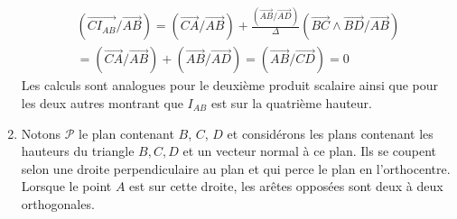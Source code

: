 \begin{enumerate}
\begin{multline*}
 (\overrightarrow{ CI_{AB}}/\overrightarrow{AB})=
 (\overrightarrow{CA}/\overrightarrow{AB}) 
+ \frac{(\overrightarrow{AB}/\overrightarrow{AD})}{\Delta} (\overrightarrow{BC}\wedge \overrightarrow{BD}/\overrightarrow{AB})\\
= (\overrightarrow{CA}/\overrightarrow{AB}) + (\overrightarrow{AB}/\overrightarrow{AD})
= (\overrightarrow{AB}/\overrightarrow{CD}) = 0
\end{multline*}
Les calculs sont analogues pour le deuxième produit scalaire ainsi que pour les deux autres montrant que $I_{AB}$ est sur la quatrième hauteur.
 \item Notons $\mathcal{P}$ le plan contenant $B$, $C$, $D$ et considérons les plans contenant les hauteurs du triangle $B,C,D$ et un vecteur normal à ce plan. Ils se coupent selon une droite perpendiculaire au plan et qui perce le plan en l'orthocentre. Lorsque le point $A$ est sur cette droite, les arêtes opposées sont deux à deux orthogonales. 
\end{enumerate}
